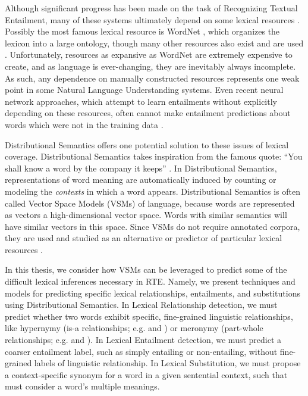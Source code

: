 Although significant progress has been made on the task of Recognizing Textual
Entailment, many of these systems ultimately depend on some lexical resources
\cite{beltagy:2014:semeval,bjerva:2014:semeval,lai:2014:semeval,marelli:2014:semeval,beltagy:2016:cl}.
Possibly the most famous lexical resource is WordNet \cite{miller:1995:acm},
which organizes the lexicon into a large ontology,
though many other resources also exist and are used
\cite{baker:1998:acl,baroni:2011:gems,baroni:2012:eacl,ganitkevitch:2013:naacl,jurgens:2012:semeval,levy:2014:conll,turney:2015:nle}.
Unfortunately, resources as expansive as WordNet are extremely expensive
to create, and as language is ever-changing, they are inevitably
always incomplete. As such, any dependence on manually constructed resources
represents one weak point in some Natural Language Understanding systems. Even
recent neural network approaches, which attempt to learn entailments without
explicitly depending on these resources, often cannot make entailment
predictions about words which were not in the training data
\cite{bowman:2015:emnlp,cheng:2016:emnlp,pavlick:2016:acl}.

Distributional Semantics offers one potential solution to these issues of lexical
coverage. Distributional Semantics takes inspiration from the famous quote:
``You shall know a word by the company it keeps'' \cite{firth:1957:la}. In
Distributional Semantics, representations of word meaning are automatically
induced by counting or modeling the {\em contexts} in which a word appears.
Distributional Semantics is often called Vector Space Models (VSMs) of
language, because words are represented as vectors a high-dimensional vector space.
Words with similar semantics will have similar vectors in this
space. Since VSMs do not require annotated corpora, they are used and
studied as an alternative or predictor of particular lexical resources
\cite{baroni:2012:eacl,erk:2010:gems,turney:2010:jair}.

In this thesis, we consider how VSMs can be leveraged to predict some of the
difficult lexical inferences necessary in RTE.  Namely, we present techniques
and models for predicting specific lexical relationships, entailments, and
substitutions using Distributional Semantics. In Lexical Relationship
detection, we must predict whether two words exhibit specific, fine-grained
linguistic relationships, like hypernymy (is-a relationships; e.g. 
and ) or meronymy (part-whole relationships; e.g.  and
). In Lexical Entailment detection, we must predict a coarser
entailment label, such as simply entailing or non-entailing, without
fine-grained labels of linguistic relationship. In Lexical Substitution, we
must propose a context-specific synonym for a word in a given sentential
context, such that must consider a word's multiple meanings. 

